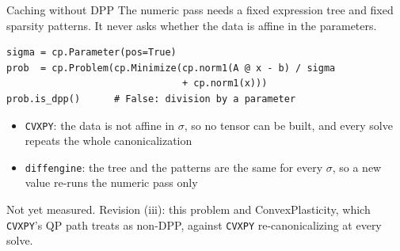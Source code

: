 \documentclass[10pt,mathserif,aspectratio=169]{beamer}
\newcommand{\bul}{\setlength\itemsep{1.1ex}}
\newcommand{\de}{\texttt{diffengine}}
\newcommand{\cvxpy}{\texttt{CVXPY}}
\begin{document}
\begin{frame}[fragile,label=bk-nondpp]{Caching without DPP}
\vspace{-0.5ex}
{\small The numeric pass needs a fixed expression tree and fixed sparsity patterns. It never
asks whether the data is affine in the parameters.}

\vspace{0.5ex}
\begin{center}
\begin{minipage}{0.80\textwidth}
\begin{lstlisting}[language=mypython, basicstyle=\ttfamily\small,
                   aboveskip=0.4em, belowskip=0.4em]
sigma = cp.Parameter(pos=True)
prob  = cp.Problem(cp.Minimize(cp.norm1(A @ x - b) / sigma
                               + cp.norm1(x)))
prob.is_dpp()      # False: division by a parameter
\end{lstlisting}
\end{minipage}
\end{center}

\vspace{0.5ex}
\begin{itemize}\small\bul
  \item \cvxpy{}: the data is not affine in $\sigma$, so no tensor can be built, and every
        solve repeats the whole canonicalization
  \item \de{}: the tree and the patterns are the same for every $\sigma$, so a new value
        re-runs the numeric pass only
\end{itemize}

\vfill
{\scriptsize\color{black!55} Not yet measured. Revision (iii): this problem and
ConvexPlasticity, which \cvxpy{}'s QP path treats as non-DPP, against \cvxpy{}
re-canonicalizing at every solve.}
\end{frame}
\end{document}
